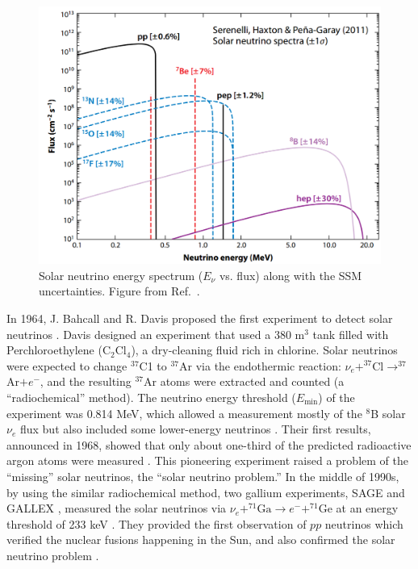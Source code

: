 \begin{figure}[htbp]
	\centering	
	\includegraphics[width=12cm]{haxton09.png}
	\caption[Solar neutrino energy spectrum.]{Solar neutrino energy spectrum ($E_\nu$ vs. flux) along with the SSM uncertainties. Figure from Ref.~\cite{haxton2013solar}.}
	\label{fig:haxton2013plot}
\end{figure}
In 1964, J. Bahcall and R. Davis proposed the first experiment to detect solar neutrinos \cite{bahcall1964solar,davis1964solar}. Davis designed an experiment that used a 380 m$^3$ tank filled with Perchloroethylene (C$_2$Cl$_4$), a dry-cleaning fluid rich in chlorine. Solar neutrinos were expected to change $^{37}$C1 to $^{37}$Ar via the endothermic reaction: $\nu_e+^{37}$Cl$\to^{37}$Ar$+e^-$, and the resulting $^{37}$Ar atoms were extracted and counted (a ``radiochemical'' method). The neutrino energy threshold ($E_{\mathrm{min}}$) of the experiment was 0.814 MeV, which allowed a measurement mostly of the $^8$B solar $\nu_e$ flux but also included some lower-energy neutrinos \cite{davis1964solar}. Their first results, announced in 1968, showed that only about one-third of the predicted radioactive argon atoms were measured \cite{davis1968search}. This pioneering experiment raised a problem of the ``missing'' solar neutrinos, the ``solar neutrino problem.'' In the middle of 1990s, by using the similar radiochemical method, two gallium experiments, SAGE \cite{gavrin2011russian} and GALLEX \cite{hampel1999gallex}, measured the solar neutrinos via $\nu_e+^{71}\mathrm{Ga} \to e^- + ^{71}\mathrm{Ge}$ at an energy threshold of 233 keV \cite{suzuki2020sun}. They provided the first observation of $pp$ neutrinos which verified the nuclear fusions happening in the Sun, and also confirmed the solar neutrino problem \cite{suzuki2020sun,zuber2020neutrino}.

